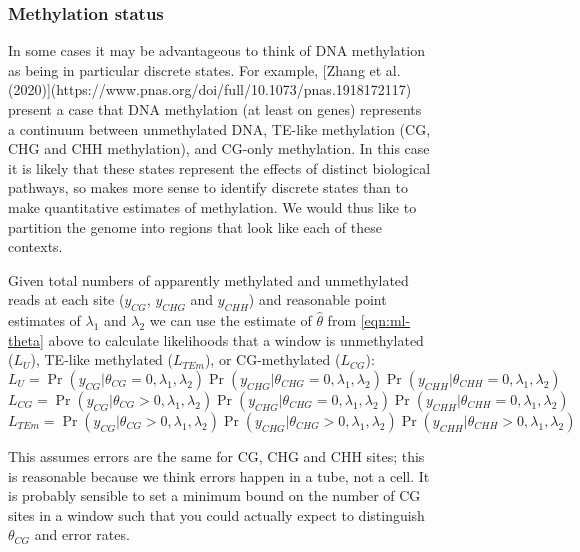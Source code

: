 \documentclass[12pt,longbibliography]{article}
\begin{document}
\begin{figure}
\subsubsection{Methylation status}

In some cases it may be advantageous to think of DNA methylation as being in particular discrete states.
For example, [Zhang et al. (2020)](https://www.pnas.org/doi/full/10.1073/pnas.1918172117) present a case that DNA methylation (at least on genes) represents a continuum between unmethylated DNA, TE-like methylation (CG, CHG and CHH methylation), and CG-only methylation.
In this case it is likely that these states represent the effects of distinct biological pathways, so makes more sense to identify discrete states than to make quantitative estimates of methylation.
We would thus like to partition the genome into regions that look like each of these contexts.

Given total numbers of apparently methylated and unmethylated reads at each site ($y_{CG}$, $y_{CHG}$ and $y_{CHH}$) and reasonable point estimates of $\lambda_1$ and $\lambda_2$ we can use the estimate of $\hat{\theta}$ from \ref{eqn:ml-theta} above to calculate likelihoods that a window is unmethylated ($L_U$), TE-like methylated ($L_{TEm}$), or CG-methylated ($L_{CG}$):
\begin{equation}
    \label{eqn:lik-unmethylated}
    L_{U} = 
    \Pr( y_{CG} | \theta_{CG} =0, \lambda_1, \lambda_2)
    \Pr(y_{CHG} | \theta_{CHG}=0, \lambda_1, \lambda_2)
    \Pr(y_{CHH} | \theta_{CHH}=0, \lambda_1, \lambda_2)
\end{equation}
\begin{equation}
    \label{eqn:lik-mCG}
    L_{CG} = 
    \Pr( y_{CG} | \theta_{CG}>0, \lambda_1, \lambda_2)
    \Pr(y_{CHG} | \theta_{CHG}=0, \lambda_1, \lambda_2)
    \Pr(y_{CHH} | \theta_{CHH}=0, \lambda_1, \lambda_2)
\end{equation}
\begin{equation}
    \label{eqn:lik-TEm}
    L_{TEm} = 
    \Pr( y_{CG} | \theta_{CG}>0, \lambda_1, \lambda_2)
    \Pr(y_{CHG} | \theta_{CHG}>0, \lambda_1, \lambda_2)
    \Pr(y_{CHH} | \theta_{CHH}>0, \lambda_1, \lambda_2)
\end{equation}

This assumes errors are the same for CG, CHG and CHH sites; this is reasonable because we think errors happen in a tube, not a cell. It is probably sensible to set a minimum bound on the number of CG sites in a window such that you could actually expect to distinguish $\theta_{CG}$ and error rates.


\end{figure}
\end{document}
